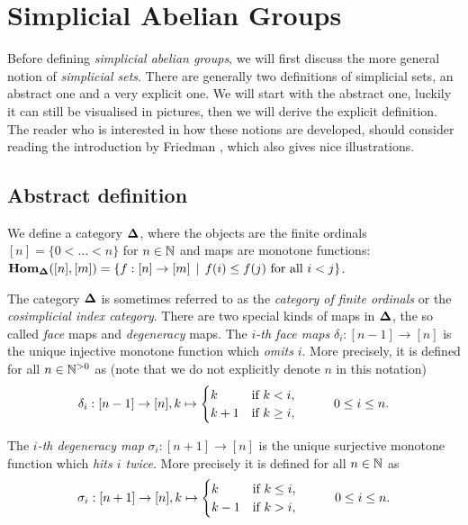 \section{Simplicial Abelian Groups}
\label{sec:Simplicial Abelian Groups}

Before defining \emph{simplicial abelian groups}, we will first discuss the more general notion of \emph{simplicial sets}. There are generally two definitions of simplicial sets, an abstract one and a very explicit one. We will start with the abstract one, luckily it can still be visualised in pictures, then we will derive the explicit definition. The reader who is interested in how these notions are developed, should consider reading the introduction by Friedman \cite{friedman}, which also gives nice illustrations.

\subsection{Abstract definition}
\begin{definition}
	We define a category $\mathbf{\Delta}$, where the objects are the finite ordinals $[n] = \{0 < \dots < n\}$ for $n \in \mathbb{N}$ and maps are monotone functions: $\mathbf{Hom}_{\mathbf{\Delta}}([n], [m]) = \{ f : [n] \to [m] \,\mid\, f(i) \leq f(j) \text{ for all } i < j \}$.
\end{definition}

The category $\mathbf{\Delta}$ is sometimes referred to as the \emph{category of finite ordinals} or the \emph{cosimplicial index category}. There are two special kinds of maps in $\mathbf{\Delta}$, the so called \emph{face} maps and \emph{degeneracy} maps. The \emph{$i$-th face maps} $\delta_i: [n-1] \to [n]$ is the unique injective monotone function which \emph{omits} $i$. More precisely, it is defined for all $n \in {\mathbb{N}^{>0}}$ as (note that we do not explicitly denote $n$ in this notation)
$$ \delta_i: [n-1] \to [n], k \mapsto \begin{cases} k & \text{if } k < i,\\ k+1 & \text{if } k \geq i, \end{cases} \hspace{1.0cm} 0 \leq i \leq n. $$

The \emph{$i$-th degeneracy map} $\sigma_i: [n+1] \to [n]$ is the unique surjective monotone function which \emph{hits $i$ twice}. More precisely it is defined for all $n \in \mathbb{N}$ as
$$ \sigma_i: [n+1] \to [n], k \mapsto \begin{cases} k & \text{if } k \leq i,\\ k-1 & \text{if } k > i, \end{cases} \hspace{1.0cm} 0 \leq i \leq n. $$

